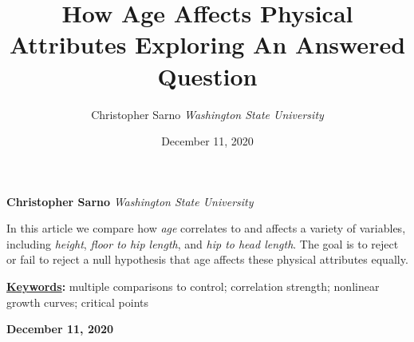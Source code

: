\documentclass[]{article}
\title{\textbf{\textcolor{WSU.crimson}{How Age Affects Physical
Attributes}} \newline \textbf{\textcolor{WSU.gray}{Exploring An Answered
Question}}  }
\author{\Large Christopher
Sarno\vspace{0.05in} \newline\normalsize\emph{Washington State
University}  }
\date{December 11, 2020}
\newcommand*{\authorfont}{\fontfamily{phv}\selectfont}
\renewenvironment{abstract}
 {{%
    \setlength{\leftmargin}{0mm}
    \setlength{\rightmargin}{\leftmargin}%
  }%
  \relax}
 {\endlist}
\begin{document}
	
%    


{%
\setlength{\parindent}{0pt}
\thispagestyle{plain}
{\fontsize{18}{20}\selectfont\raggedright 
\maketitle  %

}

{
   \vskip 13.5pt\relax \normalsize\fontsize{11}{12} 
   
\textbf{\authorfont Christopher
Sarno} \hskip 15pt \emph{\small Washington State University}   

}

}








\begin{abstract}

    \hbox{\vrule height .2pt width 39.14pc}

    \vskip 8.5pt %

\noindent In this article we compare how \emph{age} correlates to and
affects a variety of variables, including \emph{height},
\emph{floor to hip length}, and \emph{hip to head length}. The goal is
to reject or fail to reject a null hypothesis that age affects these
physical attributes equally. \vspace{0.25in}


\vskip 8.5pt \noindent \textbf{\underline{Keywords}:} multiple
comparisons to control; correlation strength; nonlinear growth curves;
critical points \par

    




    
    \hbox{\vrule height .2pt width 39.14pc}
    \vskip 5pt 
    \hfill \textbf{\textcolor{WSU.gray}{ December 11, 2020 } }
    \vskip 5pt 
    
\end{abstract}


\vskip -8.5pt



\end{document}
